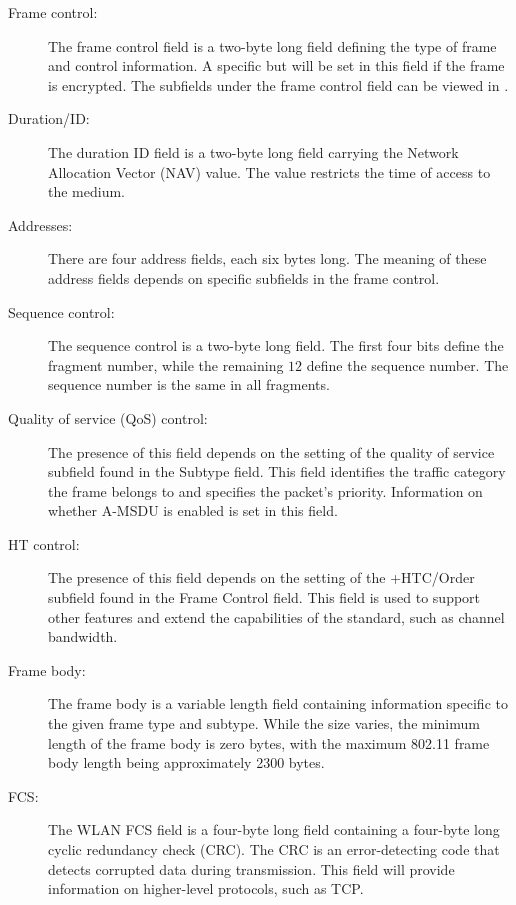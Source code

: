 \begin{description}
\item[Frame control:] The frame control field is a two-byte long field defining the type of frame and control information. A specific but will be set in this field if the frame is encrypted. The subfields under the frame control field can be viewed in . 

\item[Duration/ID:] The duration ID field is a two-byte long field carrying the Network Allocation Vector (NAV) value. The value restricts the time of access to the medium.

\item[Addresses:] There are four address fields, each six bytes long. The meaning of these address fields depends on specific subfields in the frame control.

\item[Sequence control:] The sequence control is a two-byte long field. The first four bits define the fragment number, while the remaining $12$ define the sequence number. The sequence number is the same in all fragments.

\item[Quality of service (QoS) control:] The presence of this field depends on the setting of the quality of service subfield found in the Subtype field. This field identifies the traffic category the frame belongs to and specifies the packet's priority. Information on whether A-MSDU is enabled is set in this field.

\item[HT control:] The presence of this field depends on the setting of the +HTC/Order subfield found in the Frame Control field. This field is used to support other features and extend the capabilities of the standard, such as channel bandwidth.

\item[Frame body:] The frame body is a variable length field containing information specific to the given frame type and subtype. While the size varies, the minimum length of the frame body is zero bytes, with the maximum 802.11 frame body length being approximately 2300 bytes.

\item[FCS:] The WLAN FCS field is a four-byte long field containing a four-byte long cyclic redundancy check (CRC). The CRC is an error-detecting code that detects corrupted data during transmission. This field will provide information on higher-level protocols, such as TCP.
\end{description}

